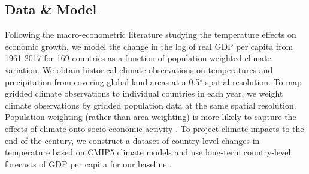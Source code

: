 \documentclass[11pt, letterpaper]{article}
\numberwithin{algorithm}{section}
\numberwithin{assumption}{section}
\numberwithin{lemma}{section}
\numberwithin{theorem}{section}
\numberwithin{corollary}{section}
\numberwithin{remark}{section}
\numberwithin{equation}{section}
\numberwithin{figure}{section}
\numberwithin{table}{section}
\newcommand{\ignore}[1]{}
\begin{document}
\subsection{Data \& Model}
Following the macro-econometric literature studying the temperature effects on economic growth, we model the change in the log of real GDP per capita \cite[World Development Indicators, ][]{rld2019world} from 1961-2017 for 169 countries as a function of population-weighted climate variation. We obtain historical climate observations on temperatures and precipitation from \citep[][ version 5]{matsuura2018terrestrial} covering global land areas at a 0.5$^\circ$ spatial resolution. To map gridded climate observations to individual countries in each year, we weight climate observations by gridded population data \citep{ciesin2016gridded} at the same spatial resolution. Population-weighting (rather than area-weighting) is more likely to capture the effects of climate onto socio-economic activity \citep[see ][]{tol2017population}. To project climate impacts to the end of the century, we construct a dataset of country-level changes in temperature \ignore{and precipitation} based on CMIP5 climate models \citep{taylor2012overview} and use long-term country-level forecasts of GDP per capita for our baseline \citep{muller2019econometric}.
\end{document}
